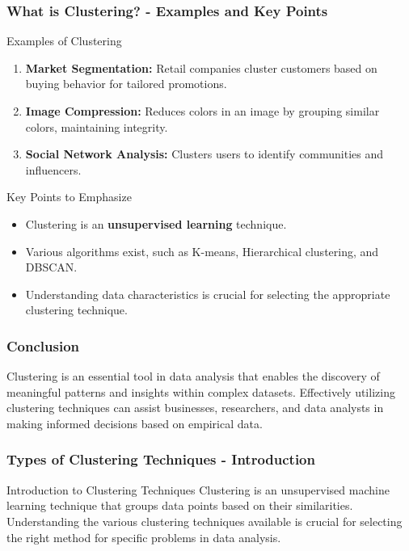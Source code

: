 \documentclass[aspectratio=169]{beamer}
\begin{document}
\begin{frame}[fragile]
    \frametitle{What is Clustering? - Examples and Key Points}
    \begin{block}{Examples of Clustering}
        \begin{enumerate}
            \item \textbf{Market Segmentation:} Retail companies cluster customers based on buying behavior for tailored promotions.
            \item \textbf{Image Compression:} Reduces colors in an image by grouping similar colors, maintaining integrity.
            \item \textbf{Social Network Analysis:} Clusters users to identify communities and influencers.
        \end{enumerate}
    \end{block}

    \begin{block}{Key Points to Emphasize}
        \begin{itemize}
            \item Clustering is an \textbf{unsupervised learning} technique.
            \item Various algorithms exist, such as K-means, Hierarchical clustering, and DBSCAN.
            \item Understanding data characteristics is crucial for selecting the appropriate clustering technique.
        \end{itemize}
    \end{block}
\end{frame}

\begin{frame}[fragile]
    \frametitle{Conclusion}
    Clustering is an essential tool in data analysis that enables the discovery of meaningful patterns and insights within complex datasets. Effectively utilizing clustering techniques can assist businesses, researchers, and data analysts in making informed decisions based on empirical data.
\end{frame}

\begin{frame}[fragile]
    \frametitle{Types of Clustering Techniques - Introduction}
    \begin{block}{Introduction to Clustering Techniques}
    Clustering is an unsupervised machine learning technique that groups data points based on their similarities. Understanding the various clustering techniques available is crucial for selecting the right method for specific problems in data analysis.
    \end{block}
\end{frame}
\end{document}
